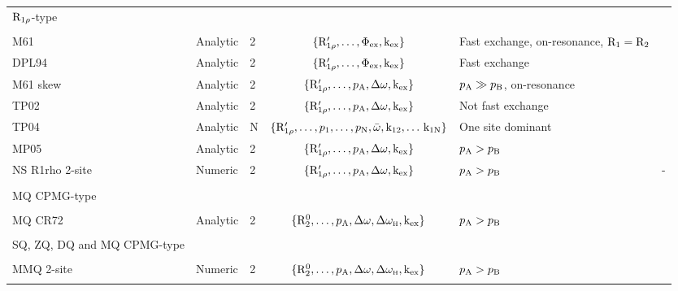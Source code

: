 \begin{sidewaystable}
\begin{center}
\begin{small}
\begin{tabular}{lllcll}
\\[-5pt]
$\mathrm{R}_{1\rho}$-type \\
\cline{1-1}
\\[-5pt]
M61             & Analytic & 2     & $\{\mathrm{R}_{1\rho}', \dots, \Phi_\textrm{ex}, \textrm{k}_\textrm{ex}\}$          & Fast exchange, on-resonance, $\mathrm{R}_1 = \mathrm{R}_2$ & \citet{Meiboom61} \\
DPL94           & Analytic & 2     & $\{\mathrm{R}_{1\rho}', \dots, \Phi_\textrm{ex}, \textrm{k}_\textrm{ex}\}$          & Fast exchange                     & \citet{Davis94} \\
M61 skew        & Analytic & 2     & $\{\mathrm{R}_{1\rho}', \dots, p_\textrm{A}, \Delta\omega, \textrm{k}_\textrm{ex}\}$        & $p_\textrm{A} \gg p_\textrm{B}$, on-resonance       & \citet{Meiboom61} \\
TP02            & Analytic & 2     & $\{\mathrm{R}_{1\rho}', \dots, p_\textrm{A}, \Delta\omega, \textrm{k}_\textrm{ex}\}$        & Not fast exchange                 & \citet{TrottPalmer02} \\
TP04            & Analytic & N     & $\{\mathrm{R}_{1\rho}', \dots, p_\textrm{1}, \dots, p_\textrm{N}, \bar\omega, \textrm{k}_\textrm{12}, \dots\, \textrm{k}_\textrm{1N}\}$    & One site dominant                 & \citet{TrottPalmer04} \\
MP05            & Analytic & 2     & $\{\mathrm{R}_{1\rho}', \dots, p_\textrm{A}, \Delta\omega, \textrm{k}_\textrm{ex}\}$        & $p_\textrm{A} > p_\textrm{B}$                       & \citet{MiloushevPalmer05} \\
NS R1rho 2-site & Numeric  & 2     & $\{\mathrm{R}_{1\rho}', \dots, p_\textrm{A}, \Delta\omega, \textrm{k}_\textrm{ex}\}$        & $p_\textrm{A} > p_\textrm{B}$                       & - \\

\\[-5pt]
MQ CPMG-type \\
\cline{1-1}
\\[-5pt]
MQ CR72         & Analytic & 2     & $\{\mathrm{R}_2^0, \dots, p_\textrm{A}, \Delta\omega, \Delta\omega_{\scriptscriptstyle\mathrm{H}}, \textrm{k}_\textrm{ex}\}$      & $p_\textrm{A} > p_\textrm{B}$                       & \citet{Korzhnev04a} \\

\\[-5pt]
SQ, ZQ, DQ and MQ CPMG-type \\
\cline{1-1}
\\[-5pt]
MMQ 2-site      & Numeric  & 2   & $\{\mathrm{R}_2^0, \dots, p_\textrm{A}, \Delta\omega, \Delta\omega_{\scriptscriptstyle\mathrm{H}}, \textrm{k}_\textrm{ex}\}$      & $p_\textrm{A} > p_\textrm{B}$                       & \citet{Korzhnev05} \\

\bottomrule

\label{table: dispersion models}

\end{tabular}
\end{small}
\end{center}
\end{sidewaystable}
